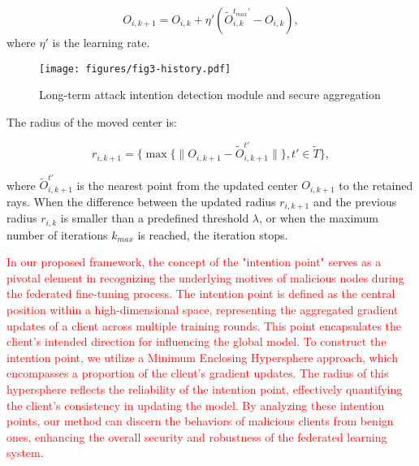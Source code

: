 \documentclass[lettersize,journal]{IEEEtran}
\begin{document}
\begin{equation}
O_{i,k+1} = O_{i,k} + \eta' (\tilde{O}_{i,k}^{t_{max}'}-O_{i,k}),
\end{equation}
where $\eta'$ is the learning rate. 

\begin{figure}[!ht]
    \centering
    \texttt{[image: figures/fig3-history.pdf]}
    \caption{Long-term attack intention detection module and secure aggregation}
    \label{fig3:longterm}
\end{figure}

The radius of the moved center is:

\begin{equation}
r_{i,k+1} =  \{ \max\{\| O_{i,k+1}-\tilde O_{i,k+1}^{t'} \|\}, t'\in \tilde T\} ,
\end{equation}



where $\tilde O_{i,k+1}^{t'}$ is the nearest point from the updated center $O_{i,k+1}$ to the retained rays. When the difference between the updated radius \( r_{i,k+1} \) and the previous radius \( r_{i,k} \) is smaller than a predefined threshold \( \lambda \), or when the maximum number of iterations $k_{max}$ is reached, the iteration stops.

\textcolor{red}{In our proposed framework, the concept of the "intention point" serves as a pivotal element in recognizing the underlying motives of malicious nodes during the federated fine-tuning process. The intention point is defined as the central position within a high-dimensional space, representing the aggregated gradient updates of a client across multiple training rounds. This point encapsulates the client's intended direction for influencing the global model. To construct the intention point, we utilize a Minimum Enclosing Hypersphere approach, which encompasses a proportion of the client’s gradient updates. The radius of this hypersphere reflects the reliability of the intention point, effectively quantifying the client's consistency in updating the model. By analyzing these intention points, our method can discern the behaviors of malicious clients from benign ones, enhancing the overall security and robustness of the federated learning system.}
\end{document}
